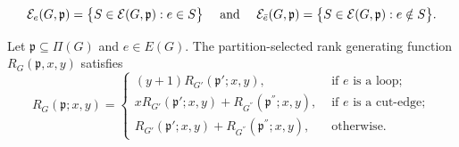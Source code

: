\documentclass[10pt,a4paper]{amsart}
\def\And{\mbox{\rm ~and~}}
\begin{document}
\begin{equation}\label{Edge-Partition}
\mathcal{E}_e(G,\mathfrak{p})=\big\{S\in\mathcal{E}(G,\mathfrak{p}):e\in S\big\}\quad\And\quad \mathcal{E}_{\bar{e}}(G,\mathfrak{p})=\big\{S\in\mathcal{E}(G,\mathfrak{p}):e\notin S\big\}.
\end{equation}

\begin{theorem}\label{Partition-Rank-DC}
Let $\mathfrak{p}\subseteq\Pi(G)$ and $e\in E(G)$. The partition-selected rank generating function $R_G(\mathfrak{p},x,y)$ satisfies
\[
R_G(\mathfrak{p};x,y)=\begin{cases}
(y+1)R_{G'}(\mathfrak{p}';x,y),&\text{ if } e \text{ is a loop};\\
xR_{G'}(\mathfrak{p}';x,y)+R_{G^{''}}(\mathfrak{p}^{''};x,y),&\text{ if } e \text{ is a cut-edge};\\
R_{G'}(\mathfrak{p}';x,y)+R_{G^{''}}(\mathfrak{p}^{''};x,y),&\text{ otherwise}.
\end{cases}
\]
\end{theorem}
\end{document}

